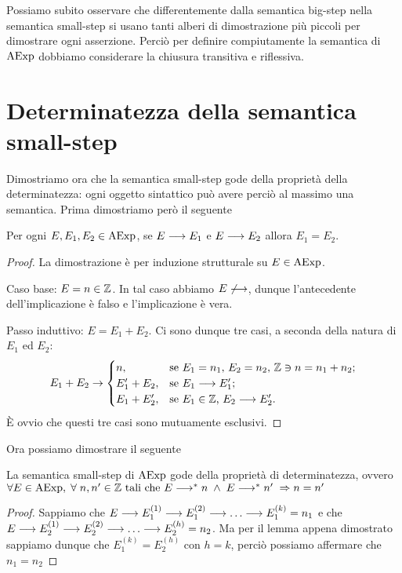 Possiamo subito osservare che differentemente dalla semantica big-step
nella semantica small-step si usano tanti alberi di dimostrazione più piccoli per dimostrare
ogni asserzione. Perciò per definire compiutamente la semantica di $\mathrm{AExp}$ dobbiamo considerare la chiusura transitiva e riflessiva.

\section{Determinatezza della semantica small-step}
Dimostriamo ora che la semantica small-step gode della proprietà della
determinatezza: ogni oggetto sintattico può avere perciò al massimo
una semantica. Prima dimostriamo però il seguente

\begin{teorema}
Per ogni $E, E_1, E_2 \in \mathrm{AExp}$, se $E \longrightarrow E_1$ e $E \longrightarrow E_2$
allora $E_1 = E_2$.
\end{teorema}

\begin{proof}
La dimostrazione è per induzione strutturale su $E \in \mathrm{AExp}$.

Caso base: $E = n \in \mathbb{Z}$.
In tal caso abbiamo $E \not \longrightarrow$, dunque l'antecedente dell'implicazione
è falso e l'implicazione è vera.

Passo induttivo: $E = E_1 + E_2$.
Ci sono dunque tre casi, a seconda della natura di $E_1$ ed $E_2$:
\[
  E_1 + E_2
    \rightarrow
      \begin{cases}
        n,          &\text{se $E_1 = n_1$, $E_2 = n_2$,
                           $\mathbb{Z} \ni n = n_1 + n_2$;} \\
        E_1' + E_2, &\text{se $E_1 \longrightarrow E_1'$;} \\
        E_1 + E_2', &\text{se $E_1 \in \mathbb{Z}$, $E_2 \longrightarrow E_2'$.}
      \end{cases}
\]
È ovvio che questi tre casi sono mutuamente esclusivi.
\end{proof}

Ora possiamo dimostrare il seguente

\begin{teorema}[Determinatezza]
La semantica small-step di $\mathrm{AExp}$ gode della proprietà di determinatezza, ovvero
$\forall E \in \mathrm{AExp}, \; \forall \; n, n' \in \mathbb{Z} \text{ tali che } E \longrightarrow ^* n \; \land \; E \longrightarrow ^* n' \; \Rightarrow n = n'$
\end{teorema}

\begin{proof}
Sappiamo che $E \ssarrow E_1^{(1)} \ssarrow E_1^{(2)} \ssarrow \dots \ssarrow E_1^{(k)} = n_1$ e che $E \ssarrow E_2^{(1)} \ssarrow E_2^{(2)} \ssarrow \dots \ssarrow E_2^{(h)} = n_2$.
Ma per il lemma appena dimostrato sappiamo dunque che $E_1^{(k)} = E_2^{(h)} \text{ con } h = k$, perciò possiamo affermare che $n_1 = n_2$
\end{proof}

